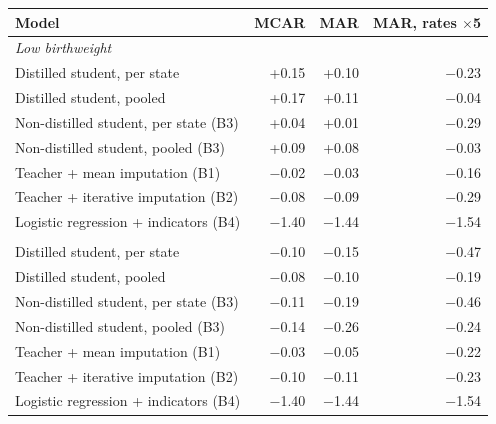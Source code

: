 \begin{tabular}{lrrr}
\toprule
Model & MCAR & MAR & MAR, rates $\times$5\\
\midrule
\multicolumn{4}{l}{\textit{Low birthweight}}\\
\quad Distilled student, per state & +0.15 & +0.10 & $-$0.23\\
\quad Distilled student, pooled & +0.17 & +0.11 & $-$0.04\\
\quad Non-distilled student, per state (B3) & +0.04 & +0.01 & $-$0.29\\
\quad Non-distilled student, pooled (B3) & +0.09 & +0.08 & $-$0.03\\
\quad Teacher + mean imputation (B1) & $-$0.02 & $-$0.03 & $-$0.16\\
\quad Teacher + iterative imputation (B2) & $-$0.08 & $-$0.09 & $-$0.29\\
\quad Logistic regression + indicators (B4) & $-$1.40 & $-$1.44 & $-$1.54\\
\addlinespace
\multicolumn{4}{l}{\textit{Preterm birth}}\\
\quad Distilled student, per state & $-$0.10 & $-$0.15 & $-$0.47\\
\quad Distilled student, pooled & $-$0.08 & $-$0.10 & $-$0.19\\
\quad Non-distilled student, per state (B3) & $-$0.11 & $-$0.19 & $-$0.46\\
\quad Non-distilled student, pooled (B3) & $-$0.14 & $-$0.26 & $-$0.24\\
\quad Teacher + mean imputation (B1) & $-$0.03 & $-$0.05 & $-$0.22\\
\quad Teacher + iterative imputation (B2) & $-$0.10 & $-$0.11 & $-$0.23\\
\quad Logistic regression + indicators (B4) & $-$1.40 & $-$1.44 & $-$1.54\\
\bottomrule
\end{tabular}
